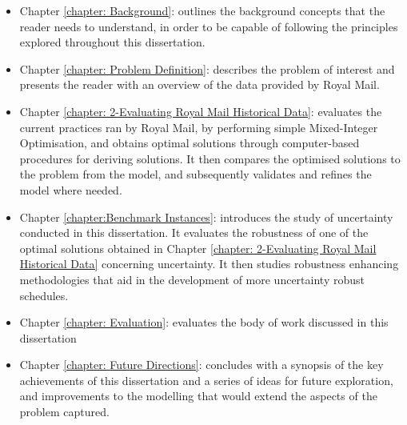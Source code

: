 \vspace{\baselineskip}
\begin{itemize}
	\item Chapter \ref{chapter: Background}: outlines the background concepts that the reader needs to understand, in order to be capable of following the principles explored throughout this dissertation.\par

	\item Chapter \ref{chapter: Problem Definition}: describes the problem of interest and presents the reader with an overview of the data provided by Royal Mail. \par

	\item Chapter \ref{chapter: 2-Evaluating Royal Mail Historical Data}: evaluates the current practices ran by Royal Mail, by performing simple Mixed-Integer Optimisation, and obtains optimal solutions through computer-based procedures for deriving solutions. It then compares the optimised solutions to the problem from the model, and subsequently validates and refines the model where needed.\par

    \item Chapter \ref{chapter:Benchmark Instances}: introduces the study of uncertainty conducted in this dissertation. It evaluates the robustness of one of the optimal solutions obtained in Chapter \ref{chapter: 2-Evaluating Royal Mail Historical Data} concerning uncertainty. It then studies robustness enhancing methodologies that aid in the development of more uncertainty robust schedules.   \par

	\item Chapter \ref{chapter: Evaluation}: evaluates the body of work discussed in this dissertation\par

	\item Chapter \ref{chapter: Future Directions}: concludes with a synopsis of the key achievements of this dissertation and a series of ideas for future exploration, and improvements to the modelling that would extend the aspects of the problem captured.
\end{itemize}\par

\vspace{\baselineskip}
